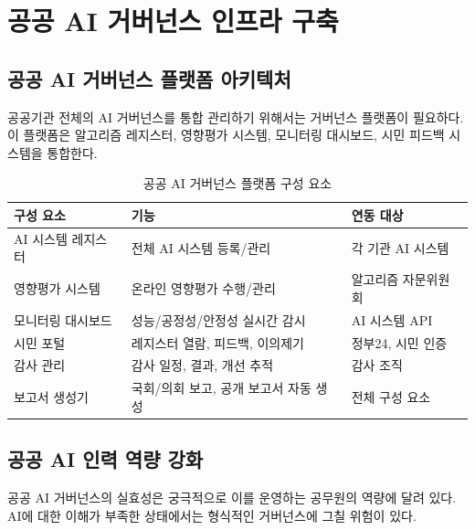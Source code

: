 \section{공공 AI 거버넌스 인프라 구축}
\label{sec:18.9}

\subsection{공공 AI 거버넌스 플랫폼 아키텍처}

공공기관 전체의 AI 거버넌스를 통합 관리하기 위해서는 거버넌스 플랫폼이 필요하다. 이 플랫폼은 알고리즘 레지스터, 영향평가 시스템, 모니터링 대시보드, 시민 피드백 시스템을 통합한다.

\begin{table}[htbp]
\centering
\caption{공공 AI 거버넌스 플랫폼 구성 요소}
\label{tab:18_platform}
\begin{tabularx}{\textwidth}{p{3cm}Xp{3.5cm}}
\toprule
\textbf{구성 요소} & \textbf{기능} & \textbf{연동 대상} \\
\midrule
AI 시스템 레지스터 & 전체 AI 시스템 등록/관리 & 각 기관 AI 시스템 \\
영향평가 시스템 & 온라인 영향평가 수행/관리 & 알고리즘 자문위원회 \\
모니터링 대시보드 & 성능/공정성/안정성 실시간 감시 & AI 시스템 API \\
시민 포털 & 레지스터 열람, 피드백, 이의제기 & 정부24, 시민 인증 \\
감사 관리 & 감사 일정, 결과, 개선 추적 & 감사 조직 \\
보고서 생성기 & 국회/의회 보고, 공개 보고서 자동 생성 & 전체 구성 요소 \\
\bottomrule
\end{tabularx}
\end{table}

\subsection{공공 AI 인력 역량 강화}

공공 AI 거버넌스의 실효성은 궁극적으로 이를 운영하는 공무원의 역량에 달려 있다. AI에 대한 이해가 부족한 상태에서는 형식적인 거버넌스에 그칠 위험이 있다.

